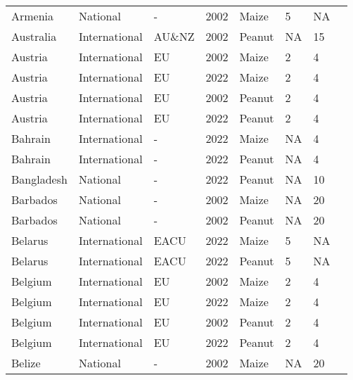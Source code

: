 \begin{landscape}
\begin{longtable}[c]{llllllll}
Armenia           & National      & -        & 2002 & Maize  & 5  & NA & \citet{van2004worldwide}     \\
Australia         & International & AU\&NZ    & 2002 & Peanut & NA & 15 & \citet{FSANZ2022}            \\
Austria           & International & EU       & 2002 & Maize  & 2  & 4  & \citet{EC2010}               \\
Austria           & International & EU       & 2022 & Maize  & 2  & 4  & \citet{EC2010}               \\
Austria           & International & EU       & 2002 & Peanut & 2  & 4  & \citet{EC2010}               \\
Austria           & International & EU       & 2022 & Peanut & 2  & 4  & \citet{EC2010}               \\
Bahrain           & International & -        & 2022 & Maize  & NA & 4  & \citet{van2004worldwide}     \\
Bahrain           & International & -        & 2022 & Peanut & NA & 4  & \citet{van2004worldwide}     \\
Bangladesh        & National      & -        & 2022 & Peanut & NA & 10 & \citet{BFSA2017}             \\
Barbados          & National      & -        & 2002 & Maize  & NA & 20 & \citet{van2004worldwide}     \\
Barbados          & National      & -        & 2002 & Peanut & NA & 20 & \citet{van2004worldwide}     \\
Belarus           & International & EACU     & 2022 & Maize  & 5  & NA & \citet{EACU2011}             \\
Belarus           & International & EACU     & 2022 & Peanut & 5  & NA & \citet{EACU2011}             \\
Belgium           & International & EU       & 2002 & Maize  & 2  & 4  & \citet{EC2010}               \\
Belgium           & International & EU       & 2022 & Maize  & 2  & 4  & \citet{EC2010}               \\
Belgium           & International & EU       & 2002 & Peanut & 2  & 4  & \citet{EC2010}               \\
Belgium           & International & EU       & 2022 & Peanut & 2  & 4  & \citet{EC2010}               \\
Belize            & National      & -        & 2002 & Maize  & NA & 20 & \citet{van2004worldwide}     \\

\end{longtable}
\end{landscape}
